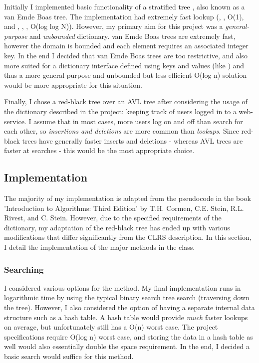 Initially I implemented basic functionality of a stratified tree \parencite{stratified}, also known as a van Emde Boas tree. The implementation had extremely fast lookup (, ,  O(1), and , , ,  O(log log N)). However, my primary aim for this project was a \textit{general-purpose} and \textit{unbounded} dictionary. van Emde Boas trees are extremely fast, however the domain is bounded and each element requires an associated integer key. In the end I decided that van Emde Boas trees are too restrictive, and also more suited for a dictionary interface defined using keys and values (like ) and thus a more general purpose and unbounded but less efficient O(log n) solution would be more appropriate for this situation.

Finally, I chose a red-black tree over an AVL tree after considering the usage of the dictionary described in the project: keeping track of users logged in to a web-service. I assume that in most cases, more users log on and off than search for each other, so \textit{insertions and deletions} are more common than \textit{lookups}. Since red-black trees have generally faster inserts and deletions \parencite{clrs} - whereas AVL trees are faster at searches - this would be the most appropriate choice.

\subsection{Implementation}

The majority of my implementation is adapted from the pseudocode in the book 'Introduction to Algorithms: Third Edition' by T.H. Cormen, C.E. Stein, R.L. Rivest, and C. Stein. However, due to the specified requirements of the dictionary, my adaptation of the red-black tree has ended up with various modifications that differ significantly from the CLRS description. In this section, I detail the implementation of the major methods in the  class.

\subsubsection{Searching}
I considered various options for the  method. My final implementation runs in logarithmic time by using the typical binary search tree search (traversing down the tree). However, I also considered the option of having a separate internal data structure such as a hash table. A hash table would provide \textit{much} faster lookups on average, but unfortunately still has a O(n) worst case. The project specifications require O(log n) worst case, and storing the data in a hash table as well would also essentially double the space requirement. In the end, I decided a basic search would suffice for this method.
 
